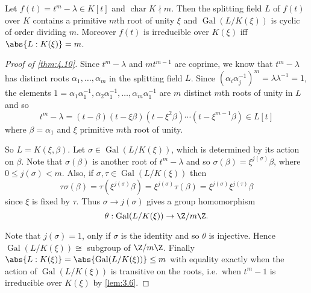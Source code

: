 \documentclass{article}
\DeclareMathOperator{\chara}{char}
\DeclareMathOperator{\Gal}{Gal}
\begin{document}
\begin{nthm}\label{thm:4.10}
    Let $f(t) = t^m - \lambda \in K[t]$ and $\chara K \nmid m$.
    Then the splitting field $L$ of $f(t)$ over $K$ contains a primitive $m$th root of unity $\xi$ and $\Gal(L/K(\xi))$ is cyclic of order dividing $m$.
    Moreover $f(t)$ is irreducible over $K(\xi)$ iff $\abs{L:K(\xi)} = m$.
\end{nthm}

\begin{proof}[Proof of \cref{thm:4.10}]
    Since $t^m - \lambda$ and $m t^{m-1}$ are coprime, we know that $t^m - \lambda$ has distinct roots $\alpha_1, \dotsc, \alpha_m$ in the splitting field $L$.
    Since $(\alpha_i \alpha_j^{-1})^m = \lambda \lambda^{-1} = 1$, the elements $1 = \alpha_1 \alpha_1^{-1}, \alpha_2 \alpha_1^{-1}, \dotsc, \alpha_m \alpha_1^{-1}$ are $m$ distinct $m$th roots of unity in $L$ and so
    \begin{equation*}
        t^m - \lambda = (t-\beta)(t-\xi\beta)(t-\xi^2 \beta)\dotsm (t-\xi^{m-1}\beta) \in L[t]
    \end{equation*}
    where $\beta = \alpha_1$ and $\xi$ primitive $m$th root of unity.

    So $L = K(\xi, \beta)$. Let $\sigma \in \Gal(L/K(\xi))$, which is determined by its action on $\beta$.
    Note that $\sigma(\beta)$ is another root of $t^m - \lambda$ and so $\sigma(\beta) = \xi^{j(\sigma)} \beta$, where $0 \leq j(\sigma) < m$.
    Also, if $\sigma, \tau \in \Gal(L/K(\xi))$ then
    \begin{equation*}
        \tau\sigma(\beta) = \tau(\xi^{j(\sigma)} \beta) = \xi^{j(\sigma)} \tau(\beta) = \xi^{j(\sigma)} \xi^{j(\tau)} \beta
    \end{equation*}
    since $\xi$ is fixed by $\tau$.
    Thus $\sigma \to j(\sigma)$ gives a group homomorphism
    \begin{equation*}
        \theta:\Gal(L/K(\xi)) \to \Z/m\Z.
    \end{equation*}

    Note that $j(\sigma) = 1$, only if $\sigma$ is the identity and so $\theta$ is injective.
    Hence $\Gal(L/K(\xi)) \cong $ subgroup of $\Z/m\Z$.
    Finally $\abs{L:K(\xi)} = \abs{\Gal(L/K(\xi))} \leq m$ with equality exactly when the action of $\Gal(L/K(\xi))$ is transitive on the roots, i.e.\ when $t^m-1$ is irreducible over $K(\xi)$ by \cref{lem:3.6}.
\end{proof}

\end{document}

